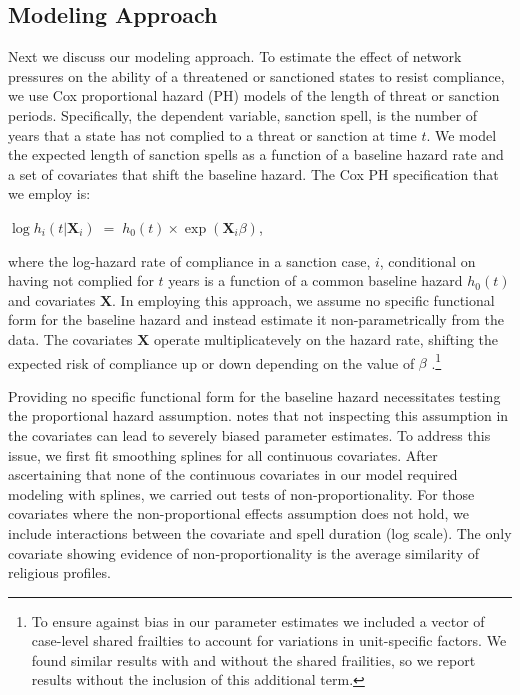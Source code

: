 
\subsection*{Modeling Approach} 

Next we discuss our modeling approach. To estimate the effect of network pressures on the ability of a threatened or sanctioned states to resist compliance, we use Cox proportional hazard (PH) models of the length of threat or sanction periods. Specifically, the dependent variable, sanction spell, is the number of years that a state has not complied to a threat or sanction at time $t$. We model the expected length of sanction spells as a function of a baseline hazard rate and a set of covariates that shift the baseline hazard. The Cox PH specification that we employ is:

\begin{center}
	$\log h_{i}(t | \boldsymbol{X}_{i}) \; = \; h_{0}(t) \times \exp(\boldsymbol{X}_{i} \beta)$,
\end{center}

where the log-hazard rate of compliance in a sanction case, $i$, conditional on having not complied for $t$ years is a function of a common baseline hazard $h_{0}(t)$ and covariates $\boldsymbol{X}$. In employing this approach, we assume no specific functional form for the baseline hazard and instead estimate it non-parametrically from the data. The covariates $\boldsymbol{X}$ operate multiplicatevely on the hazard rate, shifting the expected risk of compliance up or down depending on the value of $\beta$ \citep{crespo2013political}.\footnote{To ensure against bias in our parameter estimates we included a vector of case-level shared frailties to account for variations in unit-specific factors. We found similar results with and without the shared frailities, so we report results without the inclusion of this additional term.} 

Providing no specific functional form for the baseline hazard necessitates testing the proportional hazard assumption. \citet{keele2010proportionally} notes that not inspecting this assumption in the covariates can lead to severely biased parameter estimates. To address this issue, we first fit smoothing splines for all continuous covariates. After ascertaining that none of the continuous covariates in our model required modeling with splines, we carried out tests of non-proportionality. For those covariates where the non-proportional effects assumption does not hold, we include interactions between the covariate and spell duration (log scale). The only covariate showing evidence of non-proportionality is the average similarity of religious profiles.

